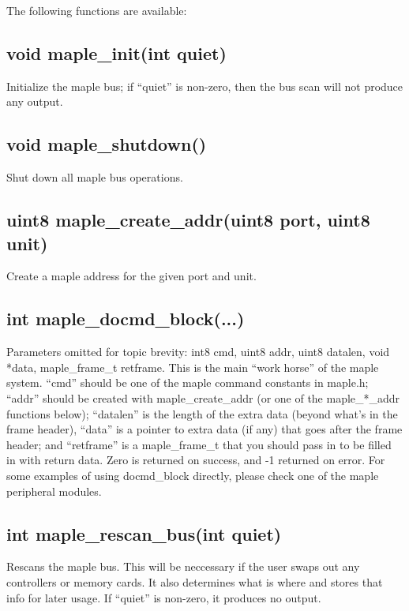 \documentclass[english]{report}
\begin{document}
The following functions are available:


\subsection{void maple\_init(int quiet)}

Initialize the maple bus; if ``quiet'' is non-zero, then the bus
scan will not produce any output.


\subsection{void maple\_shutdown()}

Shut down all maple bus operations.


\subsection{uint8 maple\_create\_addr(uint8 port, uint8 unit)}

Create a maple address for the given port and unit.


\subsection{int maple\_docmd\_block(...)}

Parameters omitted for topic brevity: int8 cmd, uint8 addr, uint8
datalen, void *data, maple\_frame\_t retframe. This is the main
``work horse'' of the maple system. ``cmd'' should be one
of the maple command constants in maple.h; ``addr'' should be
created with maple\_create\_addr (or one of the maple\_*\_addr functions
below); ``datalen'' is the length of the extra data (beyond what's
in the frame header), ``data'' is a pointer to extra data (if
any) that goes after the frame header; and ``retframe'' is a maple\_frame\_t
that you should pass in to be filled in with return data. Zero is
returned on success, and -1 returned on error. For some examples of
using docmd\_block directly, please check one of the maple peripheral
modules.


\subsection{int maple\_rescan\_bus(int quiet)}

Rescans the maple bus. This will be neccessary if the user swaps out
any controllers or memory cards. It also determines what is where
and stores that info for later usage. If ``quiet'' is non-zero,
it produces no output.
\end{document}
